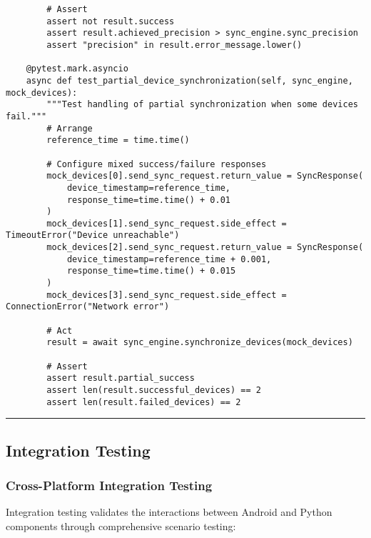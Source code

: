 \documentclass[12pt,a4paper]{article}
\begin{document}
\begin{verbatim}
        # Assert
        assert not result.success
        assert result.achieved_precision > sync_engine.sync_precision
        assert "precision" in result.error_message.lower()
    
    @pytest.mark.asyncio
    async def test_partial_device_synchronization(self, sync_engine, mock_devices):
        """Test handling of partial synchronization when some devices fail."""
        # Arrange
        reference_time = time.time()
        
        # Configure mixed success/failure responses
        mock_devices[0].send_sync_request.return_value = SyncResponse(
            device_timestamp=reference_time,
            response_time=time.time() + 0.01
        )
        mock_devices[1].send_sync_request.side_effect = TimeoutError("Device unreachable")
        mock_devices[2].send_sync_request.return_value = SyncResponse(
            device_timestamp=reference_time + 0.001,
            response_time=time.time() + 0.015
        )
        mock_devices[3].send_sync_request.side_effect = ConnectionError("Network error")
        
        # Act
        result = await sync_engine.synchronize_devices(mock_devices)
        
        # Assert
        assert result.partial_success
        assert len(result.successful_devices) == 2
        assert len(result.failed_devices) == 2
\end{verbatim}

\hrule

\subsection{Integration Testing}

\subsubsection{Cross-Platform Integration Testing}

Integration testing validates the interactions between Android and Python components through comprehensive scenario
testing:
\end{document}
